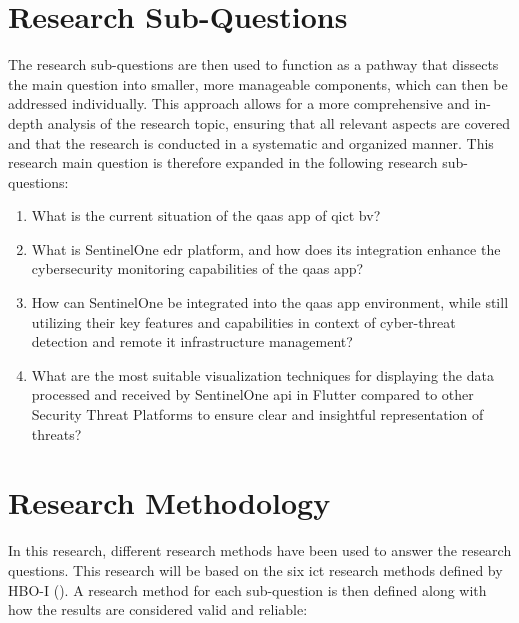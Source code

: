 \begin{multicols}{2}
  \section{Research Sub-Questions}
  The research sub-questions are then used to function as a pathway that dissects the main
  question into smaller, more manageable components, which can then be addressed individually. This approach
  allows for a more comprehensive and in-depth analysis of the research topic, ensuring that all relevant
  aspects are covered and that the research is conducted in a systematic and organized manner.
  This research main question is therefore expanded in the following research sub-questions:
  \begin{enumerate}
    \item What is the current situation of the \acrshort{qaas} app of \acrlong{qict} \acrshort{bv}?
    \item What is SentinelOne \acrshort{edr} platform, and how does its integration enhance the cybersecurity
          monitoring capabilities of the \acrshort{qaas} app?
    \item How can SentinelOne be integrated into the \acrshort{qaas} app environment, while still
          utilizing their key features and capabilities in context of cyber-threat detection and
          remote \acrshort{it} infrastructure management?
    \item What are the most suitable visualization techniques for displaying the data processed and
          received by  SentinelOne \acrshort{api} in Flutter compared to other Security Threat Platforms to
          ensure clear and insightful representation of threats?
  \end{enumerate}
  \section{Research Methodology}
  In this research, different research methods have been used to answer the research questions. This research
  will be based on the six \acrshort{ict} research methods defined by HBO-I (\cite{ictresearchmethods}). A
  research method for each sub-question is then defined along with how the results are considered valid and
  reliable:

\end{multicols}
